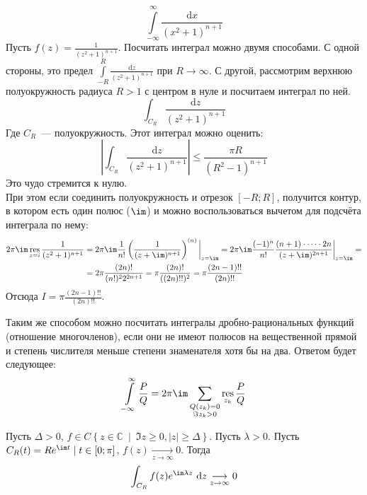 \documentclass{article}
\begin{document}
    \begin{example}
        $$
        \int\limits_{-\infty}^\infty\frac{\mathrm dx}{(x^2+1)^{n+1}}
        $$
        Пусть $f(z)=\frac1{(z^2+1)^{n+1}}$. Посчитать интеграл можно двумя способами. С одной стороны, это предел $\int\limits_{-R}^R\frac{\mathrm dz}{(z^2+1)^{n+1}}$ при $R\to\infty$. С другой, рассмотрим верхнюю полуокружность радиуса $R>1$ с центром в нуле и посчитаем интеграл по ней.
        $$
        \int_{C_R}\frac{\mathrm dz}{(z^2+1)^{n+1}}
        $$
        Где $C_R$~--- полуокружность.
        Этот интеграл можно оценить:
        $$
        \left|\int_{C_R}\frac{\mathrm dz}{(z^2+1)^{n+1}}\right|\leqslant\frac{\pi R}{(R^2-1)^{n+1}}
        $$
        Это чудо стремится к нулю.\\
        При этом если соединить полуокружность и отрезок $[-R;R]$, получится контур, в котором есть один полюс ($\im$) и можно воспользоваться вычетом для подсчёта интеграла по нему:
        \[\begin{split}
            2\pi\im\operatorname*{res}_{z=i}\frac1{(z^2+1)^{n+1}}&=2\pi\im\frac1{n!}\left(\frac1{(z+\im)^{n+1}}\right)^{(n)}\bigg|_{z=\im}=2\pi\im\frac{(-1)^n}{n!}\frac{(n+1)\cdot\cdots\cdot 2n}{(z+\im)^{2n+1}}\bigg|_{z=\im}=\\
            &=2\pi\frac{(2n)!}{(n!)^22^{2n+1}}=\pi\frac{(2n)!}{((2n)!!)^2}=\pi\frac{(2n-1)!!}{(2n)!!}
        \end{split}\]
        Отсюда $I=\pi\frac{(2n-1)!!}{(2n)!!}$.
    \end{example}
    \begin{remark}
        Таким же способом можно посчитать интегралы дробно-рациональных функций (отношение многочленов), если они не имеют полюсов на вещественной прямой и степень числителя меньше степени знаменателя хотя бы на два. Ответом будет следующее:
        $$
        \int\limits_{-\infty}^\infty\frac PQ=2\pi\im\sum\limits_{\substack{Q(z_k)=0\\\Im z_k>0}}\operatorname*{res}_{z_k}\frac PQ
        $$
    \end{remark}
    \begin{lemma}
        \label{Лемма Жордана}
        Пусть $\Delta>0$, $f\in C\left\{z\in\mathbb C~\middle|~\Im z\geqslant0,|z|\geqslant\Delta\right\}$. Пусть $\lambda>0$. Пусть $C_R(t)=Re^{\im t}\mid t\in[0;\pi]$, $f(z)\underset{z\to\infty}\rightarrow0$. Тогда
        $$
        \int_{C_R}f(z)e^{\im\lambda z}~\mathrm dz\underset{z\to\infty}\longrightarrow0
        $$
    \end{lemma}
\end{document}
